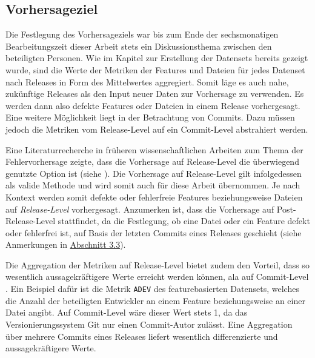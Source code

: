 \subsection*{Vorhersageziel}
Die Festlegung des Vorhersageziels war bis zum Ende der sechsmonatigen Bearbeitungszeit dieser Arbeit stets ein Diskussionsthema zwischen den beteiligten Personen. Wie im Kapitel zur Erstellung der Datensets bereits gezeigt wurde, sind die Werte der Metriken der Features und Dateien für jedes Datenset nach Releases in Form des Mittelwertes aggregiert. Somit läge es auch nahe, zukünftige Releases als den Input neuer Daten zur Vorhersage zu verwenden. Es werden dann also defekte Features oder Dateien in einem Release vorhergesagt. Eine weitere Möglichkeit liegt in der Betrachtung von Commits. Dazu müssen jedoch die Metriken vom Release-Level auf ein Commit-Level abstrahiert werden.

Eine Literaturrecherche in früheren wissenschaftlichen Arbeiten zum Thema der Fehlervorhersage zeigte, dass die Vorhersage auf Release-Level die überwiegend genutzte Option ist (siehe \cite{Queiroz2016,Zimmermann2007,Moser2008,Dhiauddin2012,Wang2012,Li2017}). Die Vorhersage auf Release-Level gilt infolgedessen als valide Methode und wird somit auch für diese Arbeit übernommen. Je nach Kontext werden somit defekte oder fehlerfreie Features beziehungsweise Dateien auf \emph{Release-Level} vorhergesagt. Anzumerken ist, dass die Vorhersage auf Post-Release-Level stattfindet, da die Festlegung, ob eine Datei oder ein Feature defekt oder fehlerfrei ist, auf Basis der letzten Commits eines Releases geschieht (siehe Anmerkungen in \hyperref[label-explanation]{Abschnitt 3.3}).

Die Aggregation der Metriken auf Release-Level bietet zudem den Vorteil, dass so wesentlich aussagekräftigere Werte erreicht werden können, ala auf Commit-Level \cite{Zimmermann2007}. Ein Beispiel dafür ist die Metrik \texttt{ADEV} des featurebasierten Datensets, welches die Anzahl der beteiligten Entwickler an einem Feature beziehungsweise an einer Datei angibt. Auf Commit-Level wäre dieser Wert stets 1, da das Versionierungssystem Git nur einen Commit-Autor zulässt. Eine Aggregation über mehrere Commits eines Releases liefert wesentlich differenzierte und aussagekräftigere Werte.

\cleardoublepage
